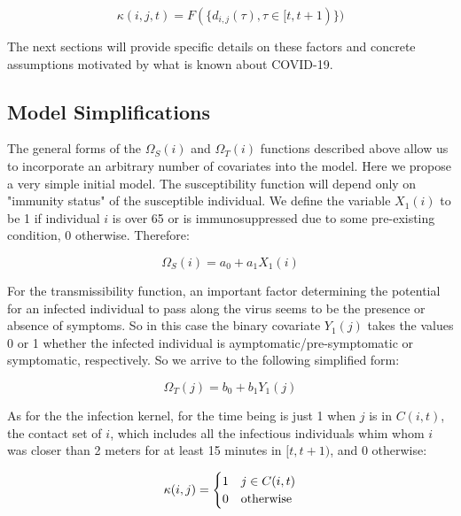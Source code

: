 \documentclass{article}
\begin{document}
\begin{equation}
\kappa(i, j, t)=F(\{d_{i,j}(\tau), \tau \in [t, t+1)\})
\end{equation}

The next sections will provide specific details on these factors and concrete assumptions motivated by what is known about COVID-19.

\subsection{Model Simplifications}

The general forms of the $\Omega_{S}(i)$ and $\Omega_{T}(i)$ functions described above allow us to incorporate an arbitrary number of covariates into the model. Here we propose a very simple initial model. The susceptibility function will depend only on "immunity status" of the susceptible individual. We define the variable $X_1(i)$ to be 1 if individual $i$ is over 65 or is immunosuppressed due to some pre-existing condition, 0 otherwise.  Therefore:

\begin{equation}
\Omega_{S}(i)=a_0 + a_1 X_1(i)
\end{equation}

For the transmissibility function, an important factor determining the potential for an infected individual to pass along the virus seems to be the presence or absence of symptoms. So in this case the binary covariate $Y_1(j)$ takes the values 0 or 1 whether the infected individual is aymptomatic/pre-symptomatic or symptomatic, respectively. So we arrive to the following simplified form:

\begin{equation}
\Omega_{T}(j)=b_0 + b_1 Y_1(j)
\end{equation}

As for the the infection kernel, for the time being is just 1 when $j$ is in $C(i, t)$, the contact set of $i$, which includes all the infectious individuals whim whom $i$ was closer than 2 meters for at least 15 minutes in $[t, t+1)$, and 0 otherwise:

\begin{equation}
\kappa(i, j)=\begin{cases} 
                1 & j \in C(i, t) \\
                0 & $otherwise$ 
             \end{cases}
\end{equation}
\end{document}
